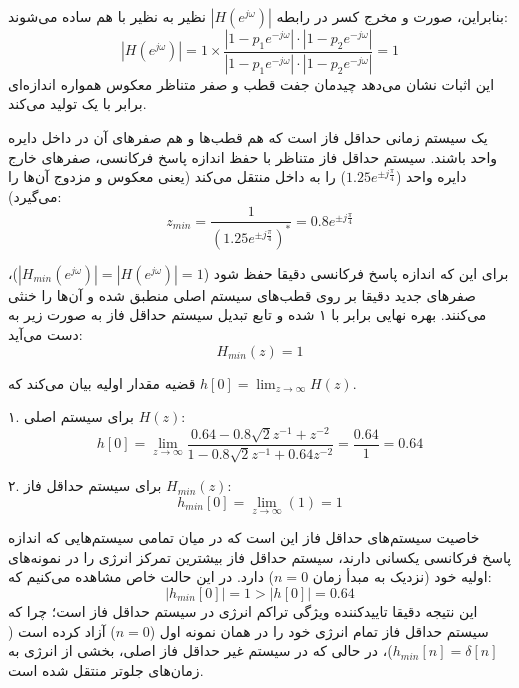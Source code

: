 بنابراین، صورت و مخرج کسر در رابطه $|H(e^{j\omega})|$ نظیر به نظیر با هم ساده می‌شوند:
\[
|H(e^{j\omega})| = 1 \times \frac{|1 - p_1 e^{-j\omega}| \cdot |1 - p_2 e^{-j\omega}|}{|1 - p_1 e^{-j\omega}| \cdot |1 - p_2 e^{-j\omega}|} = 1
\]
این اثبات نشان می‌دهد چیدمان جفت قطب و صفر متناظر معکوس همواره اندازه‌ای برابر با یک تولید می‌کند.


یک سیستم زمانی حداقل فاز است که هم قطب‌ها و هم صفرهای آن در داخل دایره واحد باشند. سیستم حداقل فاز متناظر با حفظ اندازه پاسخ فرکانسی، صفرهای خارج دایره واحد ($1.25 e^{\pm j\frac{\pi}{4}}$) را به داخل منتقل می‌کند (یعنی معکوس و مزدوج آن‌ها را می‌گیرد):
\[
z_{min} = \frac{1}{(1.25 e^{\pm j\frac{\pi}{4}})^*} = 0.8 e^{\pm j\frac{\pi}{4}}
\]

برای این که اندازه پاسخ فرکانسی دقیقا حفظ شود ($|H_{min}(e^{j\omega})| = |H(e^{j\omega})| = 1$)، صفرهای جدید دقیقا بر روی قطب‌های سیستم اصلی منطبق شده و آن‌ها را خنثی می‌کنند. بهره نهایی برابر با ۱ شده و تابع تبدیل سیستم حداقل فاز به صورت زیر به دست می‌آید:
\[
H_{min}(z) = 1
\]

قضیه مقدار اولیه بیان می‌کند که $h[0] = \lim_{z \to \infty} H(z)$.

۱. برای سیستم اصلی $H(z)$:
\[
h[0] = \lim_{z \to \infty} \frac{0.64 - 0.8\sqrt{2}z^{-1} + z^{-2}}{1 - 0.8\sqrt{2}z^{-1} + 0.64 z^{-2}} = \frac{0.64}{1} = 0.64
\]

۲. برای سیستم حداقل فاز $H_{min}(z)$:
\[
h_{min}[0] = \lim_{z \to \infty} (1) = 1
\]

خاصیت سیستم‌های حداقل فاز این است که در میان تمامی سیستم‌هایی که اندازه پاسخ فرکانسی یکسانی دارند، سیستم حداقل فاز بیشترین تمرکز انرژی را در نمونه‌های اولیه خود (نزدیک به مبدأ زمان $n=0$) دارد. 
در این حالت خاص مشاهده می‌کنیم که:
\[
|h_{min}[0]| = 1 > |h[0]| = 0.64
\]
این نتیجه دقیقا تاییدکننده ویژگی تراکم انرژی در سیستم حداقل فاز است؛ چرا که سیستم حداقل فاز تمام انرژی خود را در همان نمونه اول ($n=0$) آزاد کرده است ($h_{min}[n] = \delta[n]$)، در حالی که در سیستم غیر حداقل فاز اصلی، بخشی از انرژی به زمان‌های جلوتر منتقل شده است.
